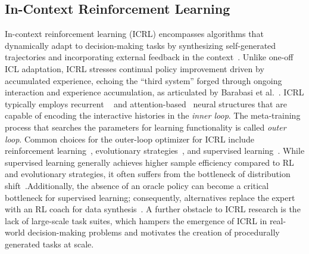 \documentclass{article}
\renewcommand{\cite}[1]{\citep{#1}}
\begin{document}
\subsection{In-Context Reinforcement Learning}
In-context reinforcement learning (ICRL) encompasses algorithms that dynamically adapt to decision-making tasks by synthesizing self-generated trajectories and incorporating external feedback in the context~\citep{duan2016rl,laskin2022context}. Unlike one-off ICL adaptation, ICRL stresses continual policy improvement driven by accumulated experience, echoing the ``third system'' forged through ongoing interaction and experience accumulation, as articulated by Barabasi et al.~\cite{barabasi2025three}.
ICRL typically employs recurrent ~\cite{duan2016rl,wang2017learning} and attention-based~\cite{laskin2022context,mishra2018simple} neural structures that are capable of encoding the interactive histories in the \emph{inner loop}. The meta-training process that searches the parameters for learning functionality is called \emph{outer loop}.
Common choices for the outer-loop optimizer for ICRL include reinforcement learning~\citep{duan2016rl, grigsbyamago, mishra2018simple}, evolutionary strategies~\citep{najarro2020meta, wang2022evolving}, and supervised learning~\citep{laskin2022context, lee2024supervised}.
While supervised learning generally achieves higher sample efficiency compared to RL and evolutionary strategies, it often suffers from the bottleneck of distribution shift~\cite{azar2017minimax, xu2020error}.Additionally, the absence of an oracle policy can become a critical bottleneck for supervised learning; consequently, alternatives replace the expert with an RL coach for data synthesis~\citep{reed2022generalist,zhang2021end}.
A further obstacle to ICRL research is the lack of large-scale task suites, which hampers the emergence of ICRL in real-world decision-making problems and motivates the creation of procedurally generated tasks at scale.
\end{document}
